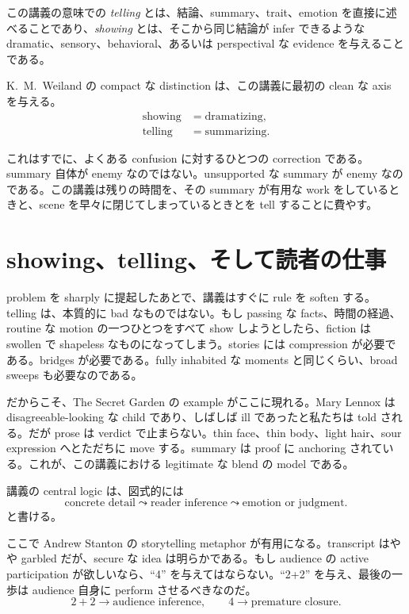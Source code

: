 \begin{definition}
この講義の意味での \emph{telling} とは、結論、summary、trait、emotion を直接に述べることであり、\emph{showing} とは、そこから同じ結論が infer できるような dramatic、sensory、behavioral、あるいは perspectival な evidence を与えることである。
\end{definition}

K.\ M.\ Weiland の compact な distinction は、この講義に最初の clean な axis を与える。
\begin{align}
\text{showing} &= \text{dramatizing},\\
\text{telling} &= \text{summarizing}.
\end{align}

これはすでに、よくある confusion に対するひとつの correction である。summary 自体が enemy なのではない。unsupported な summary が enemy なのである。この講義は残りの時間を、その summary が有用な work をしているときと、scene を早々に閉じてしまっているときとを tell することに費やす。

\section{showing、telling、そして読者の仕事}

problem を sharply に提起したあとで、講義はすぐに rule を soften する。telling は、本質的に bad なものではない。もし passing な facts、時間の経過、routine な motion の一つひとつをすべて show しようとしたら、fiction は swollen で shapeless なものになってしまう。stories には compression が必要である。bridges が必要である。fully inhabited な moments と同じくらい、broad sweeps も必要なのである。

だからこそ、The Secret Garden の example がここに現れる。Mary Lennox は disagreeable-looking な child であり、しばしば ill であったと私たちは told される。だが prose は verdict で止まらない。thin face、thin body、light hair、sour expression へとただちに move する。summary は proof に anchoring されている。これが、この講義における legitimate な blend の model である。

講義の central logic は、図式的には
\begin{equation}
\text{concrete detail} \leadsto \text{reader inference} \leadsto \text{emotion or judgment}.
\end{equation}
と書ける。

ここで Andrew Stanton の storytelling metaphor が有用になる。transcript はやや garbled だが、secure な idea は明らかである。もし audience の active participation が欲しいなら、``4'' を与えてはならない。``2+2'' を与え、最後の一歩は audience 自身に perform させるべきなのだ。
\begin{equation}
2+2 \to \text{audience inference}, \qquad 4 \to \text{premature closure}.
\end{equation}

